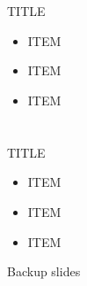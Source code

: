 \documentclass[unicode,12pt]{beamer}
\title{%
\texorpdfstring{%
\large
TITLE タイトル
\vskip10pt%
{\color{gray}\hrule height 1pt}%
\vskip-20pt%
}
{title}
}
\author{%
\texorpdfstring{%
\small
NAME 名前
\\[-\baselineskip]  
{%
\setlength{\leftmargini}{12pt}
\setlength{\leftmarginii}{16pt}
\begin{itemize}
 \footnotesize
 \color{black}
 \setlength\itemsep{0pt}
 \setlength\parskip{0pt}
 \item Motivation
 \begin{itemize}
  \footnotesize
  \color{black}
  \item ...
 \end{itemize}
 \item Model and method
 \begin{itemize}
  \footnotesize
  \color{black}
  \item ...
  \item ...
 \end{itemize}
 \item Results
 \begin{itemize}
  \footnotesize
  \color{black}
  \item ...
 \end{itemize}
 \item Conclusions
 \begin{itemize}
  \footnotesize
  \color{black}
  \item ...
 \end{itemize}
\end{itemize}
}
}
{NAME}
}
\date{}
\begin{document}

\begin{frame}
\maketitle
\end{frame}


\section[]{}
\begin{frame}[containsverbatim,c]{%
TITLE}
\begin{center}
\footnotesize
{\setlength{\leftmargini}{12pt}
\setlength{\leftmarginii}{16pt}
\begin{itemize}
 \item
ITEM
 \item
ITEM
 \item
ITEM
\end{itemize}}
\end{center}
\end{frame}

\section[]{}
\begin{frame}[containsverbatim,c]{%
TITLE}
\begin{center}
\footnotesize
{\setlength{\leftmargini}{12pt}
\setlength{\leftmarginii}{16pt}
\begin{itemize}
 \item
ITEM
 \item
ITEM
 \item
ITEM
\end{itemize}}
\end{center}
\end{frame}

\appendix
\bgroup   
{}
\begin{frame}[plain]{}
\end{frame}
\egroup
\bgroup
{}
\begin{frame}[plain]{}
\centering
Backup slides
\end{frame}
\egroup
\end{document}
